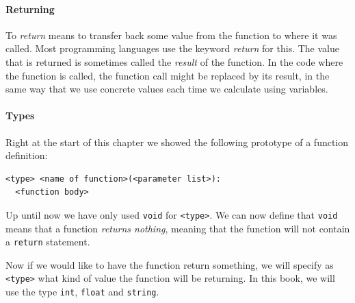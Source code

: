\paragraph{Returning}

To \emph{return} means to transfer back some value from the function to where it was called. Most programming languages use the keyword \emph{return} for this. The value that is returned is sometimes called the \emph{result} of the function. In the code where the function is called, the function call might be replaced by its result, in the same way that we use concrete values each time we calculate using variables.

\paragraph{Types}

Right at the start of this chapter we showed the following prototype of a function definition:

\begin{verbatim}
<type> <name of function>(<parameter list>):
  <function body>
\end{verbatim}

Up until now we have only used \texttt{void} for \texttt{<type>}. We can now define that \texttt{void} means that a function \emph{returns nothing}, meaning that the function will not contain a \texttt{return} statement.

Now if we would like to have the function return something, we will specify as \texttt{<type>} what kind of value the function will be returning. In this book, we will use the type \texttt{int}, \texttt{float} and \texttt{string}.

